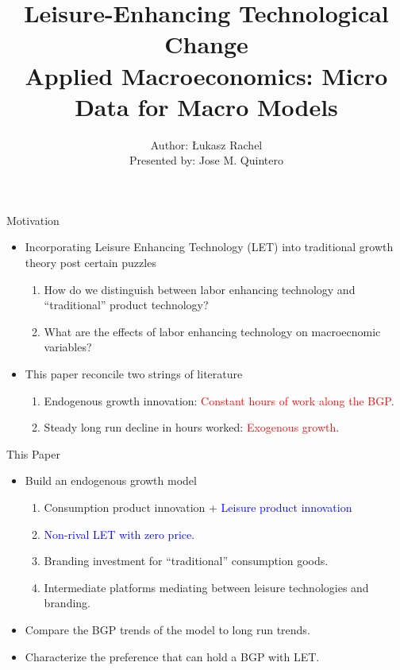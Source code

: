 \documentclass[usenames,dvipsnames]{beamer}
\title{Leisure-Enhancing Technological Change  \\ \small{Applied Macroeconomics: Micro Data for Macro Models} }
\author{Author: Łukasz Rachel \\ 
Presented by: Jose M. Quintero}
\begin{document}
\begin{frame}
  \titlepage
\end{frame}

\begin{frame}{Motivation}\label{p1:Int}
\begin{itemize}
    \item Incorporating  Leisure Enhancing Technology (LET) into traditional growth theory post certain puzzles \hyperlink{p1:Mot}{}
    \begin{enumerate}
        \item How do we distinguish between labor enhancing technology and ``traditional'' product technology?
        \item What are the effects of labor enhancing technology on macroecnomic variables? 
    \end{enumerate}
    \item This paper reconcile two strings of literature
    \begin{enumerate}
        \item Endogenous growth innovation: \textcolor{red}{Constant hours of work along the BGP}.  
        \item Steady long run decline in hours worked: \textcolor{red}{Exogenous growth}.
    \end{enumerate}
\end{itemize}
\end{frame}

\begin{frame}{This Paper}
\begin{itemize}
    \item Build an endogenous growth model
    \begin{enumerate}
        \item Consumption product innovation + \textcolor{blue}{Leisure product innovation}
        \item \textcolor{blue}{Non-rival LET with zero price.} 
        \item Branding investment for ``traditional'' consumption goods.
        \item Intermediate platforms mediating between leisure technologies and branding.   
    \end{enumerate}
    \item Compare the BGP trends of the model to long run trends. 
    \item Characterize the preference that can hold a BGP with LET. 
\end{itemize}
\end{frame}
\end{document}
